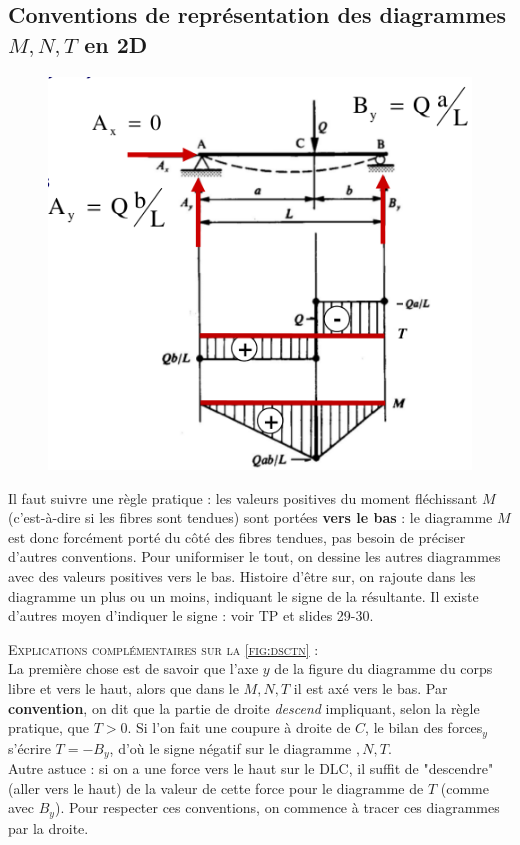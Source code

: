 	\subsection{Conventions de représentation des diagrammes $M, N, T$ 
	en 2D}
	\begin{figure}
	\vspace{-8mm}
	\includegraphics[scale=0.45]{ch2/image8.png}
	\label{fig:dsctn}
	\end{figure}	
	Il faut suivre une règle pratique : les valeurs positives du 
	moment fléchissant $M$ (c'est-à-dire si les fibres sont tendues) 
	sont portées \textbf{vers le bas} : le diagramme $M$ est donc 
	forcément porté du côté des fibres tendues, pas besoin de préciser 
	d'autres conventions. Pour uniformiser le tout, on dessine les autres 
	diagrammes avec des valeurs positives vers le bas. Histoire d'être 
	sur, on rajoute dans les diagramme un plus ou un moins, indiquant 
	le signe de la résultante. Il existe d'autres moyen d'indiquer 
	le signe : voir TP et slides 29-30.
	
	\newpage
	\textsc{Explications complémentaires sur la \autoref{fig:dsctn}} : \\
	La première chose est de savoir que l'axe $y$ de la figure du 
	diagramme du corps libre et vers le haut, alors que dans le 
	$M,N,T$ il est axé vers le bas. Par \textbf{convention}, on dit 
	que la partie de droite \textit{descend} impliquant, selon la 
	règle pratique, que $T>0$. Si l'on fait une coupure à droite de 
	$C$, le bilan des forces$_y$ s'écrire $T=-B_y$, d'où le signe 
	négatif sur le diagramme $,N,T$.\\
	Autre astuce : si on a une force vers le haut sur le DLC, il 
	suffit de "descendre" (aller vers le haut) de la valeur de cette 
	force pour le diagramme de $T$ (comme avec $B_y$). Pour respecter 
	ces conventions, on commence à tracer ces diagrammes par la 
	droite.\\
	
